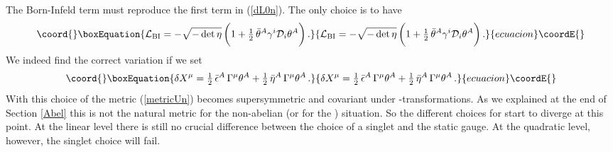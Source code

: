 \documentclass[12pt,a4paper]{article}
\def\half{{\textstyle {1 \over 2}}}
\def\Dpartial{{\cal D}}
\begin{document}
The Born-Infeld term must reproduce the first term in (\ref{dL0n}).
The only choice is to have
\begin{equation}\coord{}\boxEquation{
  \label{LBInab0}
    {\cal L}_{{\rm BI}} = -\sqrt{-\det\eta}\,\bigg(
    1 + \half\,\bar\theta^A\gamma^i\Dpartial_i\theta^A \bigg)\,.
}{
  {\cal L}_{{\rm BI}} = -\sqrt{-\det\eta}\,\bigg(
    1 + \half\,\bar\theta^A\gamma^i\Dpartial_i\theta^A \bigg)\,.
}{ecuacion}\coordE{}\end{equation}
We indeed find the correct variation if we set
\begin{equation}\coord{}\boxEquation{
   \label{dXnab}
   \delta X^\mu  = \half\,\bar\epsilon^A\,\Gamma^\mu\theta^A
       + \half\,\bar\eta^A\,\Gamma^\mu\theta^A \,.
}{
   \delta X^\mu  = \half\,\bar\epsilon^A\,\Gamma^\mu\theta^A
       + \half\,\bar\eta^A\,\Gamma^\mu\theta^A \,.
}{ecuacion}\coordE{}\end{equation}
With this choice of \coordHE{} the metric (\ref{metricUn})
becomes supersymmetric and covariant under \myHighlight{$\kappa$}\coordHE{}-transformations.
As we explained at the end of Section \ref{Abel} this is not
the natural metric for the non-abelian (or for the \coordHE{})
situation. So the different choices for \coordHE{}
start to diverge at this point. At the linear level there is still
no crucial difference between the choice of a singlet \coordHE{}
and the static gauge. At the quadratic level, however, the
singlet choice will fail.
\end{document}
